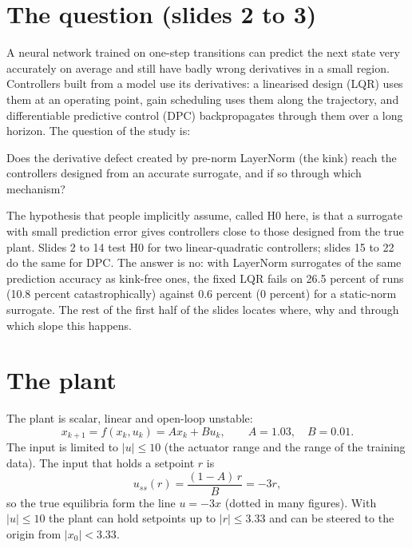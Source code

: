 \documentclass[11pt]{article}
\begin{document}
\section{The question (slides 2 to 3)}\label{sec:question}

A neural network trained on one-step transitions can predict the next state very accurately on average and still have badly wrong derivatives in a small region. Controllers built from a model use its derivatives: a linearised design (LQR) uses them at an operating point, gain scheduling uses them along the trajectory, and differentiable predictive control (DPC) backpropagates through them over a long horizon. The question of the study is:

Does the derivative defect created by pre-norm LayerNorm (the kink) reach the controllers designed from an accurate surrogate, and if so through which mechanism?

The hypothesis that people implicitly assume, called H0 here, is that a surrogate with small prediction error gives controllers close to those designed from the true plant. Slides 2 to 14 test H0 for two linear-quadratic controllers; slides 15 to 22 do the same for DPC. The answer is no: with LayerNorm surrogates of the same prediction accuracy as kink-free ones, the fixed LQR fails on 26.5 percent of runs (10.8 percent catastrophically) against 0.6 percent (0 percent) for a static-norm surrogate. The rest of the first half of the slides locates where, why and through which slope this happens.

\section{The plant}\label{sec:plant}

The plant is scalar, linear and open-loop unstable:
\begin{equation}
x_{k+1} = f(x_k,u_k) = A x_k + B u_k, \qquad A = 1.03,\quad B = 0.01 .
\end{equation}
The input is limited to $|u|\le 10$ (the actuator range and the range of the training data). The input that holds a setpoint $r$ is
\begin{equation}
u_{ss}(r) = \frac{(1-A)\,r}{B} = -3r ,
\end{equation}
so the true equilibria form the line $u=-3x$ (dotted in many figures). With $|u|\le 10$ the plant can hold setpoints up to $|r|\le 3.33$ and can be steered to the origin from $|x_0|<3.33$.
\end{document}
